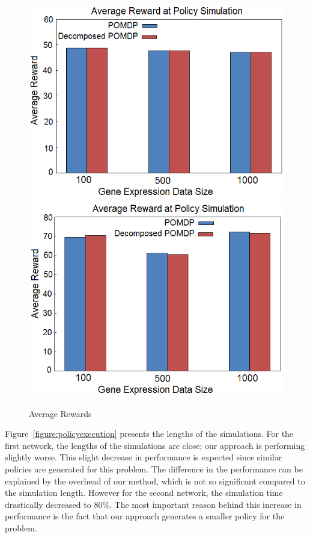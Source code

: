 \begin{figure}[h!]
\centering
\includegraphics[scale=0.5]{experiments/graph7.png}
\includegraphics[scale=0.5]{experiments/graph8.png}
\caption{Average Rewards}\label{figure:averagereward}
\end{figure}
Figure~\ref{figure:policyexecution} presents the lengths of the simulations. For the first network, the
lengths of the simulations are close; our approach is performing slightly worse. This slight decrease in
performance is expected since similar policies are generated for this problem. The difference in the
performance can be explained by the overhead of our method, which is not so significant compared to the
simulation length. However for the second network, the simulation time drastically decreased to 80\%. The
most important reason behind this increase in performance is the fact that our approach generates a smaller
policy for the problem.

